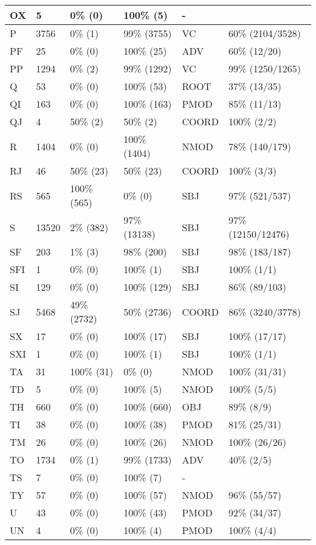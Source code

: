 \begin{figure*}
\begin{tabular}{|l|l|l|l||l|l|}
\hline
 OX & 5 & 0\% (0) & 100\% (5) & - &  \\ 
\hline
 P & 3756 & 0\% (1) & 99\% (3755) & VC & 60\% (2104/3528) \\ 
\hline
 PF & 25 & 0\% (0) & 100\% (25) & ADV & 60\% (12/20) \\ 
\hline
 PP & 1294 & 0\% (2) & 99\% (1292) & VC & 99\% (1250/1265) \\ 
\hline
 Q & 53 & 0\% (0) & 100\% (53) & ROOT & 37\% (13/35) \\ 
\hline
 QI & 163 & 0\% (0) & 100\% (163) & PMOD & 85\% (11/13) \\ 
\hline
 QJ & 4 & 50\% (2) & 50\% (2) & COORD & 100\% (2/2) \\ 
\hline
 R & 1404 & 0\% (0) & 100\% (1404) & NMOD & 78\% (140/179) \\ 
\hline
 RJ & 46 & 50\% (23) & 50\% (23) & COORD & 100\% (3/3) \\ 
\hline
 RS & 565 & 100\% (565) & 0\% (0) & SBJ & 97\% (521/537) \\ 
\hline
 S & 13520 & 2\% (382) & 97\% (13138) & SBJ & 97\% (12150/12476) \\ 
\hline
 SF & 203 & 1\% (3) & 98\% (200) & SBJ & 98\% (183/187) \\ 
\hline
 SFI & 1 & 0\% (0) & 100\% (1) & SBJ & 100\% (1/1) \\ 
\hline
 SI & 129 & 0\% (0) & 100\% (129) & SBJ & 86\% (89/103) \\ 
\hline
 SJ & 5468 & 49\% (2732) & 50\% (2736) & COORD & 86\% (3240/3778) \\ 
\hline
 SX & 17 & 0\% (0) & 100\% (17) & SBJ & 100\% (17/17) \\ 
\hline
 SXI & 1 & 0\% (0) & 100\% (1) & SBJ & 100\% (1/1) \\ 
\hline
 TA & 31 & 100\% (31) & 0\% (0) & NMOD & 100\% (31/31) \\ 
\hline
 TD & 5 & 0\% (0) & 100\% (5) & NMOD & 100\% (5/5) \\ 
\hline
 TH & 660 & 0\% (0) & 100\% (660) & OBJ & 89\% (8/9) \\ 
\hline
 TI & 38 & 0\% (0) & 100\% (38) & PMOD & 81\% (25/31) \\ 
\hline
 TM & 26 & 0\% (0) & 100\% (26) & NMOD & 100\% (26/26) \\ 
\hline
 TO & 1734 & 0\% (1) & 99\% (1733) & ADV & 40\% (2/5) \\ 
\hline
 TS & 7 & 0\% (0) & 100\% (7) & - &  \\ 
\hline
 TY & 57 & 0\% (0) & 100\% (57) & NMOD & 96\% (55/57) \\ 
\hline
 U & 43 & 0\% (0) & 100\% (43) & PMOD & 92\% (34/37) \\ 
\hline
 UN & 4 & 0\% (0) & 100\% (4) & PMOD & 100\% (4/4) \\ 
\hline
\end{tabular}
\end{figure*}
